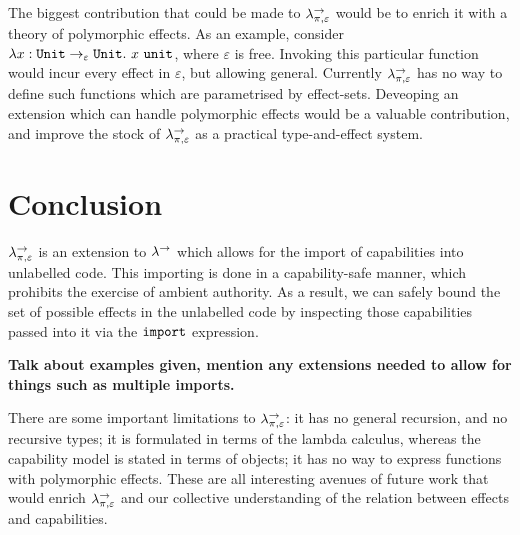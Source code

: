 The biggest contribution that could be made to $\lambda^{\rightarrow}_{\pi, \varepsilon}$ would be to enrich it with a theory of polymorphic effects. As an example, consider $\lambda x: \mathtt{Unit} \rightarrow_{\varepsilon} \mathtt{Unit} . ~x~\mathtt{unit}$, where $\varepsilon$ is free. Invoking this particular function would incur every effect in $\varepsilon$, but allowing general. Currently $\lambda^{\rightarrow}_{\pi, \varepsilon}$ has no way to define such functions which are parametrised by effect-sets. Deveoping an extension which can handle polymorphic effects would be a valuable contribution, and improve the stock of $\lambda^{\rightarrow}_{\pi, \varepsilon}$ as a practical type-and-effect system.

\section{Conclusion}

$\lambda^{\rightarrow}_{\pi, \varepsilon}$ is an extension to $\lambda^{\rightarrow}$ which allows for the import of capabilities into unlabelled code. This importing is done in a capability-safe manner, which prohibits the exercise of ambient authority. As a result, we can safely bound the set of possible effects in the unlabelled code by inspecting those capabilities passed into it via the $\mathtt{import}$ expression.

\textbf{Talk about examples given, mention any extensions needed to allow for things such as multiple imports.}

There are some important limitations to $\lambda^{\rightarrow}_{\pi, \varepsilon}$: it has no general recursion, and no recursive types; it is formulated in terms of the lambda calculus, whereas the capability model is stated in terms of objects; it has no way to express functions with polymorphic effects. These are all interesting avenues of future work that would enrich $\lambda^{\rightarrow}_{\pi, \varepsilon}$ and our collective understanding of the relation between effects and capabilities.






